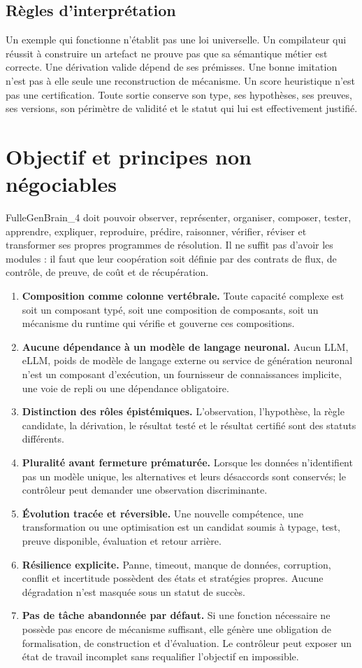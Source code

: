 \documentclass[11pt,a4paper]{article}
\begin{document}
\subsection{Règles d'interprétation}
Un exemple qui fonctionne n'établit pas une loi universelle. Un compilateur qui réussit à construire un artefact ne prouve pas que sa sémantique métier est correcte. Une dérivation valide dépend de ses prémisses. Une bonne imitation n'est pas à elle seule une reconstruction de mécanisme. Un score heuristique n'est pas une certification. Toute sortie conserve son type, ses hypothèses, ses preuves, ses versions, son périmètre de validité et le statut qui lui est effectivement justifié.

\section{Objectif et principes non négociables}
FulleGenBrain\_4 doit pouvoir observer, représenter, organiser, composer, tester, apprendre, expliquer, reproduire, prédire, raisonner, vérifier, réviser et transformer ses propres programmes de résolution. Il ne suffit pas d'avoir les modules : il faut que leur coopération soit définie par des contrats de flux, de contrôle, de preuve, de coût et de récupération.

\begin{enumerate}
\item \textbf{Composition comme colonne vertébrale.} Toute capacité complexe est soit un composant typé, soit une composition de composants, soit un mécanisme du runtime qui vérifie et gouverne ces compositions.
\item \textbf{Aucune dépendance à un modèle de langage neuronal.} Aucun LLM, eLLM, poids de modèle de langage externe ou service de génération neuronal n'est un composant d'exécution, un fournisseur de connaissances implicite, une voie de repli ou une dépendance obligatoire.
\item \textbf{Distinction des rôles épistémiques.} L'observation, l'hypothèse, la règle candidate, la dérivation, le résultat testé et le résultat certifié sont des statuts différents.
\item \textbf{Pluralité avant fermeture prématurée.} Lorsque les données n'identifient pas un modèle unique, les alternatives et leurs désaccords sont conservés; le contrôleur peut demander une observation discriminante.
\item \textbf{Évolution tracée et réversible.} Une nouvelle compétence, une transformation ou une optimisation est un candidat soumis à typage, test, preuve disponible, évaluation et retour arrière.
\item \textbf{Résilience explicite.} Panne, timeout, manque de données, corruption, conflit et incertitude possèdent des états et stratégies propres. Aucune dégradation n'est masquée sous un statut de succès.
\item \textbf{Pas de tâche abandonnée par défaut.} Si une fonction nécessaire ne possède pas encore de mécanisme suffisant, elle génère une obligation de formalisation, de construction et d'évaluation. Le contrôleur peut exposer un état de travail incomplet sans requalifier l'objectif en impossible.
\end{enumerate}
\end{document}
